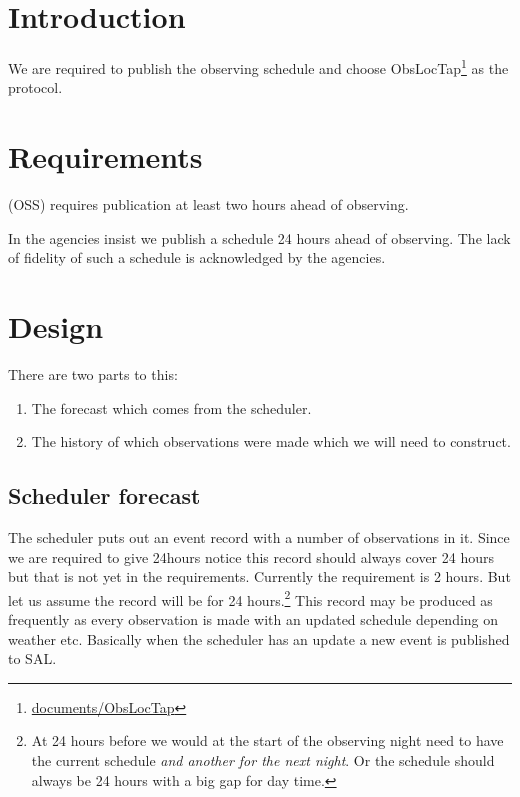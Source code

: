 \def\DB{ObsLocTAP database }

\section{Introduction}
We are required to publish the observing schedule and choose ObsLocTap\footnote{\url{documents/ObsLocTap}} as the protocol.

\section{Requirements}

 (OSS) requires publication at least two hours ahead of observing.

In  the agencies insist we publish a schedule 24 hours ahead of observing.
The lack of fidelity of such a schedule is acknowledged by the agencies.



\section{Design}


There are two parts to this:


\begin{enumerate}
\item The forecast  which comes from the scheduler.
\item The history of which observations were made which we will need to construct.
\end{enumerate}

\subsection{Scheduler forecast}
The scheduler puts out an event record with a number of observations in it.
Since we are required to give 24hours notice this record should always cover 24 hours but that is not
yet in the requirements.
Currently the requirement is 2 hours.
But let us assume the record will be for 24 hours.\footnote{
At 24 hours before we would at the start of the observing night need to have the current schedule \emph{and another for the next night}.
Or the schedule should always be 24 hours with a big gap for day time.
}
This record may be produced as frequently as every observation is made with an updated schedule depending on weather etc.
Basically when the scheduler has an update a new event is published to SAL.

